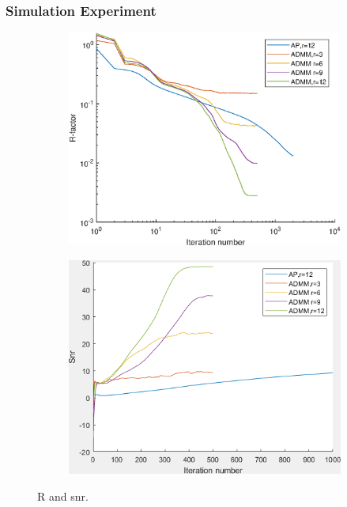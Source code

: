 \documentclass[UTF8]{beamer}
\begin{document}
\begin{frame} \frametitle{Simulation Experiment}
 \begin{figure}[H]
 \begin{subfigure}{.5\textwidth}
    \centering
    \includegraphics[width=1\linewidth]{../figures/modes_R.eps}  
    \label{fig:modes_R}
 \end{subfigure}
 \begin{subfigure}{.45\textwidth}
    \centering
    \includegraphics[width=1\linewidth]{../figures/modes_snr.png}  
    \label{fig:modes_snr}
 \end{subfigure}
 \caption{R and snr. }
 \label{fig:noise}
 \end{figure}



\end{frame}
\end{document}
